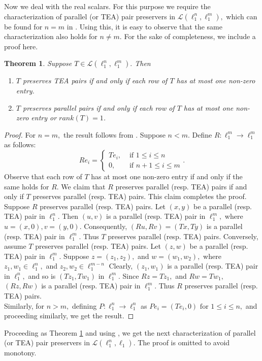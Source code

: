 \documentclass{amsart}
\newtheorem{theorem}{Theorem}[section]
\theoremstyle{definition}
\theoremstyle{remark}
\numberwithin{equation}{section}
\begin{document}
Now we deal with the real scalars. For this purpose we require the characterization of parallel (or TEA) pair preservers in $\mathcal{L}(\ell_1^n,\ell_1^m),$ which can be found for $n=m$ in \cite[Theorem 2.2]{LTWW}. Using this,  it is easy to observe that the same characterization also holds for $n\neq m.$ For the sake of completeness, we include a proof here.
\begin{theorem}\label{th-li}
Suppose $T\in\mathcal{L}(\ell_1^n,\ell_1^m).$  Then 
\begin{enumerate}
\item $T$ preserves TEA pairs if and only if each row of $T$ has at most one non-zero entry.
\item 	$T$ preserves parallel pairs if and only if each row of $T$ has at most one non-zero entry or $rank(T)=1$.
\end{enumerate}	
\end{theorem} 
\begin{proof}
For $n=m,$ the result follows from 	\cite[Theorem 2.2]{LTWW}. Suppose $n<m.$ Define $R:\ell_1^m\to \ell_1^m$ as follows:
\[Re_i=\begin{cases}
	Te_i, &\text{ if } 1\leq i\leq n\\
	0,&\text{ if } n+1\leq i\leq m
	\end{cases}.\] 
Observe that each row of $T$ has at most one non-zero entry if and only if the same holds for $R.$ 
We claim that $R$ preserves parallel (resp. TEA) pairs if and only if $T$ preserves parallel (resp. TEA) pairs. This claim completes the proof.\\
 Suppose $R$ preserves parallel (resp. TEA) pairs.  Let $(x,y)$ be a parallel (resp. TEA) pair in $\ell_1^n.$ Then $(u,v)$ is a parallel (resp. TEA) pair in $\ell_1^m,$ where $u=(x,0), v=(y,0).$ Consequently, $(Ru,Rv)=(Tx,Ty)$ is a parallel (resp. TEA) pair in $\ell_1^m.$ Thus $T$ preserves parallel (resp. TEA) pairs. Conversely, assume $T$ preserves parallel (resp. TEA) pairs. Let $(z,w)$ be a parallel (resp. TEA) pair in $\ell_1^m.$ Suppose $z=(z_1,z_2),$ and $w=(w_1,w_2),$ where $z_1,w_1\in \ell_1^n,$ and $z_2,w_2\in \ell_1^{m-n}$ Clearly, $(z_1,w_1)$ is a parallel (resp. TEA) pair in $\ell_1^n,$ and so is $(Tz_1,Tw_1)$  in $\ell_1^m.$ Since $Rz=Tz_1,$ and $Rw=Tw_1,$  $(Rz,Rw)$ is a parallel  (resp. TEA) pair in $\ell_1^m.$ Thus $R$ preserves parallel  (resp. TEA) pairs. \\
 
 Similarly, for $n>m,$ defining  $P:\ell_1^n\to \ell_1^n$ as 
 $Pe_i=(Te_i,0) \text{ for } 1\leq i\leq n,$ and proceeding similarly, we get the result.
\end{proof}
Proceeding  as Theorem \ref{th-li} and using \cite[Theorem 3.5]{LTWW}, we get the next characterization of parallel (or TEA) pair preservers in $\mathcal{L}(\ell_1^n,\ell_1).$ The proof is omitted to avoid monotony.
\end{document}
